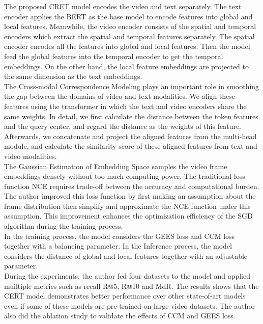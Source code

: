 \documentclass{article}
\begin{document}
The proposed CRET model encodes the video and text separately.  The text encoder applies the BERT as the base model to encode features into global and local features. Meanwhile, the video encoder consists of the spatial and temporal encoders which extract the spatial and temporal features separately. The spatial encoder encodes all the features into global and local features. Then the model feed the global features into the temporal encoder to get the temporal embeddings. On the other hand, the local feature embeddings are projected to the same dimension as the text embeddings.\\

The Cross-modal Correspondence Modeling plays an important role in smoothing the gap between the domains of video and text modalities. We align these features using the transformer in which the text and video encoders share the same weights. In detail, we first calculate the distance between the token features and the query center, and regard the distance as the weights of this feature. Afterwards, we concatenate and project the aligned features from the multi-head module, and calculate the similarity score of these aligned features from text and video modalities.\\

The Gaussian Estimation of Embedding Space samples the video frame embeddings densely without too much computing power. The traditional loss function NCE requires trade-off between the accuracy and computational burden. The author improved this loss function by first making an assumption about the frame distribution then simplify and approximate the NCE function under this assumption. This improvement enhances the optimization efficiency of the SGD algorithm during the training process.\\

In the training process, the model considers the GEES loss and CCM loss together with a balancing parameter. In the Inference process, the model considers the distance of global and local features together with an adjustable parameter.\\

During the experiments, the author fed four datasets to the model and applied muiltiple metrics such as recall R@5, R@10 and MdR. The results shows that the CERT model demonstrates better performance over other state-of-art models even if some of these models are pre-trained on large video datasets. The author also did the ablation study to validate the effects of CCM and GEES loss.\\
\end{document}
